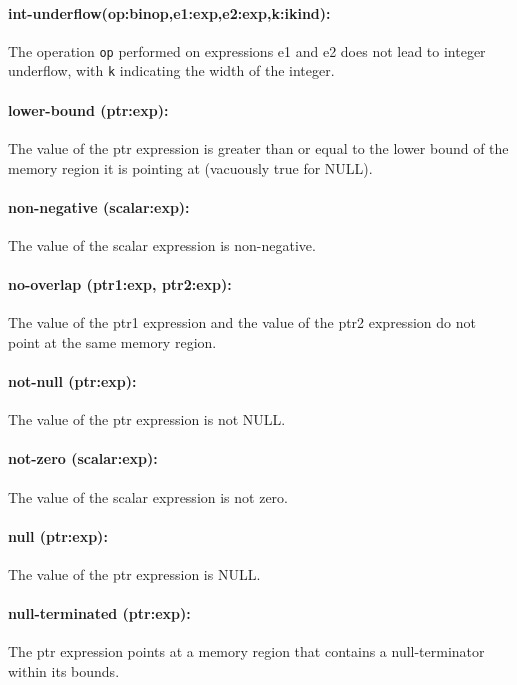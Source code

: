 \documentclass[11pt]{article}
\begin{document}
\paragraph{int-underflow(op:binop,e1:exp,e2:exp,k:ikind): }
The operation {\tt op} performed on expressions e1 and e2 does not lead to
integer underflow, with {\tt k} indicating the width of the integer.

\paragraph{lower-bound (ptr:exp):}
The value of the ptr expression is greater than or equal to the
    lower bound of the memory region it is pointing at (vacuously true for NULL).
    
\paragraph{non-negative (scalar:exp):}
The value of the scalar expression is non-negative.

\paragraph{no-overlap (ptr1:exp, ptr2:exp): }
The value of the ptr1 expression and the value of the ptr2
   expression do not point at the same memory region.

\paragraph{not-null (ptr:exp):}
The value of the ptr expression is not NULL.

\paragraph{not-zero (scalar:exp): }
The value of the scalar expression is not zero.

\paragraph{null (ptr:exp): }
The value of the ptr expression is NULL.

\paragraph{null-terminated (ptr:exp): }
The ptr expression points at a memory region that contains a null-terminator
within its bounds.
\end{document}
